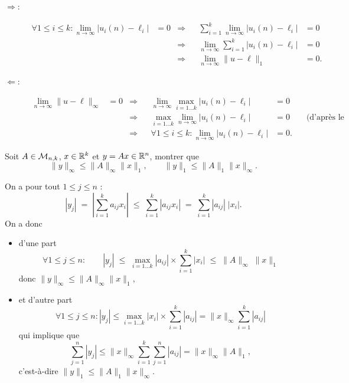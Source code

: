 \begin{description}
  \item[$\Rightarrow$:]
    \begin{align*}
      \forall 1 \leq i \leq k: \lim_{n \rightarrow \infty} |u_i(n) - \ell_i| & = 0 
      & \Rightarrow & & \sum_{i=1}^k \lim_{n \rightarrow \infty} |u_i(n) - \ell_i| & = 0 \\
      & & \Rightarrow & & \lim_{n \rightarrow \infty} \sum_{i=1}^k |u_i(n) - \ell_i| & = 0 \\
      & & \Rightarrow & &  \lim_{n \rightarrow \infty} \|u - \ell\|_1 & = 0. 
    \end{align*}
  \item[$\Leftarrow$:]
  \begin{align*}
    \lim_{n \rightarrow \infty} \|u - \ell\|_\infty & = 0
    & \Rightarrow & & \lim_{n \rightarrow \infty} \max_{i=1 \dots k} |u_i(n) - \ell_i| & = 0 \\
    & & \Rightarrow & & \max_{i=1 \dots k} \lim_{n \rightarrow \infty} |u_i(n) - \ell_i| & = 0 \qquad \text{(d'après le lemme)}\\
    & & \Rightarrow & & \forall 1 \leq i \leq k: \lim_{n \rightarrow \infty} |u_i(n) - \ell_i| & = 0.
  \end{align*}
\end{description} 
\eproof

\begin{proposition} \label{prop:normeProduitMatriceVecteur}
  Soit $A \in \mathcal{M}_{n, k}$, $x \in \mathbb{R}^k$ et $y = Ax \in \mathbb{R}^n$, montrer que 
  $$
  \|y\|_\infty \leq \|A\|_\infty \|x\|_1, \qquad
  \|y\|_1 \leq \|A\|_1 \|x\|_\infty.
  $$
\end{proposition}

On a pour tout $1 \leq j \leq n$ :
$$
|y_j| 
\; = \; \left|\sum_{i=1}^k a_{ij} x_i \right| 
\; \leq \; \sum_{i=1}^k |a_{ij} x_i| 
\; = \; \sum_{i=1}^k |a_{ij}| \; |x_i|.
$$
On a donc
\begin{itemize}
  \item d'une part
  $$
  \forall 1 \leq j \leq n: \qquad |y_j| 
  \; \leq \; \max_{i=1 \dots k} |a_{ij}| \times \sum_{i=1}^k |x_i| 
  \; \leq \; \|A\|_\infty \; \|x\|_1
  $$
  donc $\|y\|_\infty \leq \|A\|_\infty \|x\|_1$,
  \item et d'autre part
  $$
  \forall 1 \leq j \leq n: |y_j| 
  \leq \max_{i=1 \dots k} |x_i| \times \sum_{i=1}^k |a_{ij}| = \|x\|_\infty \sum_{i=1}^k |a_{ij}| 
  $$
  qui implique que
  $$
  \sum_{j=1}^n |y_j| 
  \leq \|x\|_\infty \sum_{i=1}^k \sum_{j=1}^n |a_{ij}| = \|x\|_\infty \|A\|_1,
  $$
  c'est-à-dire $\|y\|_1 \leq \|A\|_1 \|x\|_\infty$.
\end{itemize}
\eproof

